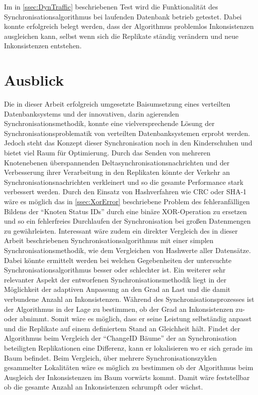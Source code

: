 \documentclass[a4paper,11pt,oneside,%
headsepline,												%
footsepline,												%
bibtotocnumbered									%
]{scrreprt}
\begin{document}
Im in \autoref{ssec:DynTraffic} beschriebenen Test wird die Funktionalität des Synchronisationsalgorithmus  bei laufenden Datenbank betrieb getestet. Dabei konnte erfolgreich belegt werden, dass der Algorithmus problemlos Inkonsistenzen ausgleichen kann, selbst wenn sich die Replikate ständig verändern und neue Inkonsistenzen entstehen.

\section{Ausblick}
Die in dieser Arbeit erfolgreich umgesetzte Baisumsetzung eines verteilten Datenbanksystems und der innovativen, darin agierenden Synchronisationsmethodik, konnte eine vielversprechende Lösung der Synchronisationsproblematik von verteilten Datenbanksystemen erprobt werden. Jedoch steht das Konzept dieser Synchronisation noch in den Kinderschuhen und bietet viel Raum für Optimierung. Durch das Senden von mehreren Knotenebenen überspannenden Deltasynchronisationsnachrichten und der Verbesserung ihrer Verarbeitung in den Replikaten könnte der Verkehr an Synchronisationsnachrichten verkleinert und so die gesamte Performance stark verbessert werden. Durch den Einsatz von Hashverfahren wie CRC oder SHA-1 wäre es möglich das in \autoref{ssec:XorError} beschriebene Problem des fehleranfälligen Bildens der \enquote{Knoten Status IDs} durch eine binäre XOR-Operation zu ersetzen und so ein fehlerfreies Durchlaufen der Synchronisation bei großen Datenmengen zu gewährleisten. Interessant wäre zudem ein direkter Vergleich des in dieser Arbeit beschriebenen Synchronisationsalgorithmus mit einer simplen Synchronisationsmethodik, wie dem Vergleichen von Hashwerte aller Datensätze. Dabei könnte ermittelt werden bei welchen Gegebenheiten der untersuchte Synchronisationsalgorithmus besser oder schlechter ist.  
Ein weiterer sehr relevanter Aspekt der entworfenen Synchronisationsmethodik liegt in der Möglichkeit der adaptiven Anpassung an den Grad an Last und die damit verbundene Anzahl an Inkonsistenzen. Während des Synchronisationsprozesses ist der Algorithmus in der Lage zu bestimmen, ob der Grad an Inkonsistenzen zu- oder abnimmt. Somit wäre es möglich, dass er seine Leistung selbständig anpasst und die Replikate auf einem definiertem Stand an Gleichheit hält. Findet der Algorithmus beim Vergleich der \enquote{ChangeID Bäume} der an Synchronisation beteiligten Replikationen eine Differenz, kann er lokalisieren wo er sich gerade im Baum befindet. Beim Vergleich, über mehrere Synchronisationszyklen gesammelter Lokalitäten wäre es möglich zu bestimmen ob der Algorithmus beim Ausgleich der Inkonsistenzen im Baum vorwärts kommt. Damit wäre feststellbar ob die gesamte Anzahl an Inkonsistenzen schrumpft oder wächst. 
\end{document}
